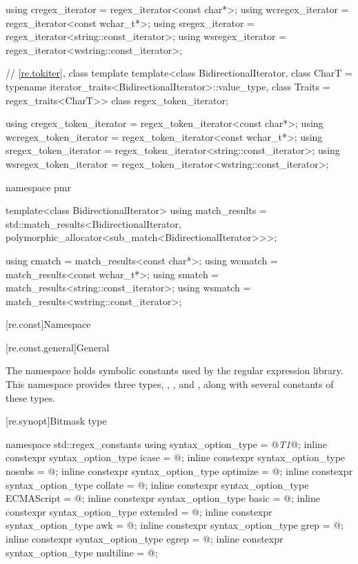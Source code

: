 \begin{codeblock}
{  using cregex_iterator  = regex_iterator<const char*>;
  using wcregex_iterator = regex_iterator<const wchar_t*>;
  using sregex_iterator  = regex_iterator<string::const_iterator>;
  using wsregex_iterator = regex_iterator<wstring::const_iterator>;

  // \ref{re.tokiter}, class template 
  template<class BidirectionalIterator,
           class CharT = typename iterator_traits<BidirectionalIterator>::value_type,
           class Traits = regex_traits<CharT>>
    class regex_token_iterator;

  using cregex_token_iterator  = regex_token_iterator<const char*>;
  using wcregex_token_iterator = regex_token_iterator<const wchar_t*>;
  using sregex_token_iterator  = regex_token_iterator<string::const_iterator>;
  using wsregex_token_iterator = regex_token_iterator<wstring::const_iterator>;

  namespace pmr {
    template<class BidirectionalIterator>
      using match_results =
        std::match_results<BidirectionalIterator,
                           polymorphic_allocator<sub_match<BidirectionalIterator>>>;

    using cmatch  = match_results<const char*>;
    using wcmatch = match_results<const wchar_t*>;
    using smatch  = match_results<string::const_iterator>;
    using wsmatch = match_results<wstring::const_iterator>;
  }
}
\end{codeblock}

[re.const]{Namespace }

[re.const.general]{General}

\pnum
{}%
The namespace  holds
symbolic constants used by the regular expression library.  This
namespace provides three types, ,
, and , along with several
constants of these types.

[re.synopt]{Bitmask type }
%
%
\begin{codeblock}
namespace std::regex_constants {
  using syntax_option_type = @\textit{T1}@;
  inline constexpr syntax_option_type icase = @\unspec@;
  inline constexpr syntax_option_type nosubs = @\unspec@;
  inline constexpr syntax_option_type optimize = @\unspec@;
  inline constexpr syntax_option_type collate = @\unspec@;
  inline constexpr syntax_option_type ECMAScript = @\unspec@;
  inline constexpr syntax_option_type basic = @\unspec@;
  inline constexpr syntax_option_type extended = @\unspec@;
  inline constexpr syntax_option_type awk = @\unspec@;
  inline constexpr syntax_option_type grep = @\unspec@;
  inline constexpr syntax_option_type egrep = @\unspec@;
  inline constexpr syntax_option_type multiline = @\unspec@;
}
\end{codeblock}

